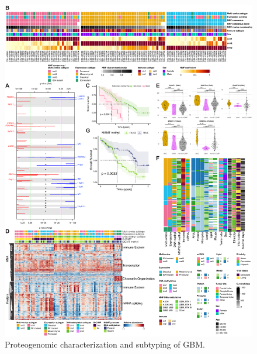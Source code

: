 \begin{figure}[p]
    \centering
    \includegraphics[width=0.95\linewidth]{figures/chap04_cptac_gbm_discov/figures2_subtypes.pdf}
    \caption[Proteogenomic characterization and subtyping of GBM.]{%
        Proteogenomic characterization and subtyping of GBM.
        \legendcontdnote
    }
    \label{fig:gbm-subtype}
\end{figure}
